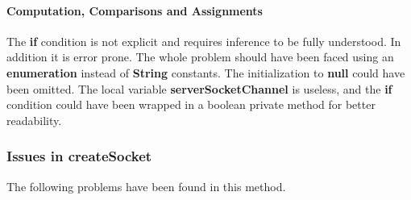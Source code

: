 \paragraph{Computation, Comparisons and Assignments}
\begin{itemize}
		\begin{itemize}
				The \textbf{if} condition is not explicit and requires inference to be fully understood.
				In addition it is error prone.
				The whole problem should have been faced using an \textbf{enumeration} instead of \textbf{String} constants.
				The initialization to \textbf{null} could have been omitted.
				The local variable \textbf{serverSocketChannel} is useless, and the \textbf{if} condition could have been wrapped in a boolean private method for better readability.
		\end{itemize}
\end{itemize}




\subsubsection{Issues in createSocket}
The following problems have been found in this method.


